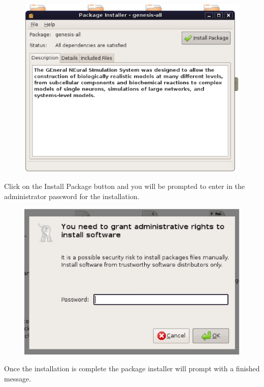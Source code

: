 \documentclass[12pt]{article}
\begin{document}
\begin{figure}[h]
   \centering
   \includegraphics[scale=0.25]{figures/install-user-deb-pkg.eps}
\end{figure}

\newpage

Click on the Install Package button and you will be prompted to enter in the administrator password for the installation.

\begin{figure}[h]
   \centering
   \includegraphics[scale=0.3]{figures/install-user-deb-admin.eps}
\end{figure}

Once the installation is complete the package installer will prompt with a finished message.
\end{document}
